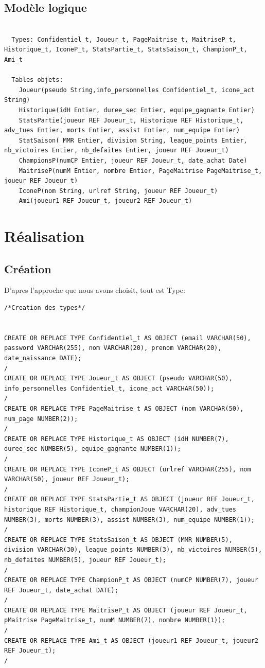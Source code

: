 \documentclass[a4paper,10pt]{report}
\begin{document}
\section{Modèle logique}
\begin{lstlisting}

  Types: Confidentiel_t, Joueur_t, PageMaitrise_t, MaitriseP_t, Historique_t, IconeP_t, StatsPartie_t, StatsSaison_t, ChampionP_t, Ami_t

  Tables objets:
    Joueur(pseudo String,info_personnelles Confidentiel_t, icone_act String)
    Historique(idH Entier, duree_sec Entier, equipe_gagnante Entier)
    StatsPartie(joueur REF Joueur_t, Historique REF Historique_t, adv_tues Entier, morts Entier, assist Entier, num_equipe Entier)
    StatSaison( MMR Entier, division String, league_points Entier, nb_victoires Entier, nb_defaites Entier, joueur REF Joueur_t)
    ChampionsP(numCP Entier, joueur REF Joueur_t, date_achat Date)
    MaitriseP(numM Entier, nombre Entier, PageMaitrise PageMaitrise_t, joueur REF Joueur_t)
    IconeP(nom String, urlref String, joueur REF Joueur_t)
    Ami(joueur1 REF Joueur_t, joueur2 REF Joueur_t)

\end{lstlisting}


\chapter{Réalisation}
\section{Création}
D'apres l'approche que nous avons choisit, tout est Type:
\begin{lstlisting}
/*Creation des types*/


CREATE OR REPLACE TYPE Confidentiel_t AS OBJECT (email VARCHAR(50), password VARCHAR(255), nom VARCHAR(20), prenom VARCHAR(20), date_naissance DATE);
/
CREATE OR REPLACE TYPE Joueur_t AS OBJECT (pseudo VARCHAR(50), info_personnelles Confidentiel_t, icone_act VARCHAR(50));
/
CREATE OR REPLACE TYPE PageMaitrise_t AS OBJECT (nom VARCHAR(50), num_page NUMBER(2));
/
CREATE OR REPLACE TYPE Historique_t AS OBJECT (idH NUMBER(7), duree_sec NUMBER(5), equipe_gagnante NUMBER(1));
/
CREATE OR REPLACE TYPE IconeP_t AS OBJECT (urlref VARCHAR(255), nom VARCHAR(50), joueur REF Joueur_t);
/
CREATE OR REPLACE TYPE StatsPartie_t AS OBJECT (joueur REF Joueur_t, historique REF Historique_t, championJoue VARCHAR(20), adv_tues NUMBER(3), morts NUMBER(3), assist NUMBER(3), num_equipe NUMBER(1));
/
CREATE OR REPLACE TYPE StatsSaison_t AS OBJECT (MMR NUMBER(5), division VARCHAR(30), league_points NUMBER(3), nb_victoires NUMBER(5), nb_defaites NUMBER(5), joueur REF Joueur_t);
/
CREATE OR REPLACE TYPE ChampionP_t AS OBJECT (numCP NUMBER(7), joueur REF Joueur_t, date_achat DATE);
/
CREATE OR REPLACE TYPE MaitriseP_t AS OBJECT (joueur REF Joueur_t, pMaitrise PageMaitrise_t, numM NUMBER(7), nombre NUMBER(1));
/
CREATE OR REPLACE TYPE Ami_t AS OBJECT (joueur1 REF Joueur_t, joueur2 REF Joueur_t);
/
\end{lstlisting}
\end{document}

